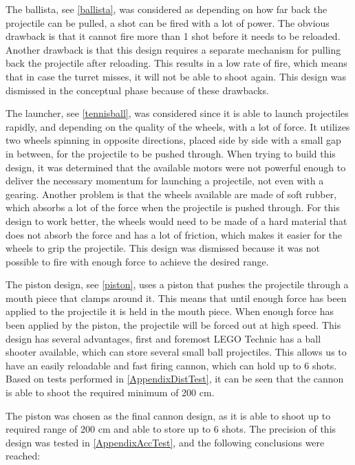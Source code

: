 The ballista, see \autoref{ballista}, was considered as
depending on how far back the projectile can be pulled, a shot can be fired with a lot of power. The obvious drawback is that it cannot fire more than 1 shot before it needs to be reloaded. Another drawback is that this design requires a separate mechanism for pulling back the projectile after reloading. This results in a low rate of fire, which means that in case the turret misses, it will not be able to shoot again. This design was dismissed in the conceptual phase because of these drawbacks.\nl

The launcher, see \autoref{tennisball}, was considered since it is able to launch
projectiles rapidly, and depending on the quality of the wheels, with a lot of force. It utilizes two wheels spinning in opposite directions, placed side by side with a small gap in between, for the projectile to be pushed through. When trying to build this design, it was determined that the available motors were not powerful enough to deliver the necessary momentum for launching a projectile, not even with a gearing. Another problem is that the wheels available are made of soft rubber, which absorbs a lot of the force when the projectile is pushed through. For this design to work better, the wheels would need to be made of a hard material that does not absorb the force and has a lot of friction, which makes it easier for the wheels to grip the projectile. This design was dismissed because it was not possible to fire with enough force to achieve the desired range.\nl

The piston design, see \autoref{piston}, uses a piston that pushes the
projectile through a mouth piece that clamps around it. This means that until enough force has been applied to the projectile it is held in the mouth piece. When enough force has been applied by the piston, the projectile will be forced out at high speed. This
design has several advantages, first and foremost LEGO Technic has a ball shooter available, which can store several small ball projectiles. This allows us to have an easily reloadable and fast firing cannon, which can hold up to 6 shots. Based on tests performed in \autoref{AppendixDistTest}, it can be seen that the cannon is able to shoot the required minimum of 200 cm.


The piston was chosen as the final cannon design, as it is able to shoot up to
required range of 200 cm and able to store up to 6 shots. The precision of this
design was tested in \autoref{AppendixAccTest}, and the following conclusions
were reached:

